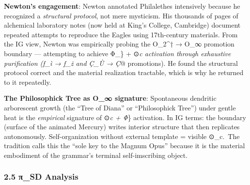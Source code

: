\documentclass[
  11pt,
  a4paper,
]{article}
\begin{document}
\textbf{Newton's engagement}: Newton annotated Philalethes intensively
because he recognized a \emph{structural protocol}, not mere mysticism.
His thousands of pages of alchemical laboratory notes (now held at
King's College, Cambridge) document repeated attempts to reproduce the
Eagles using 17th-century materials. From the IG view, Newton was
empirically probing the O\_2\^{}† → O\_∞ promotion boundary ---
attempting to achieve Φ\_\} + ⊙\emph{c activation through exhaustive
purification (ƒ\_ì → ƒ\_ż and Ç\_Ù → Ç}@ promotions). He found the
structural protocol correct and the material realization tractable,
which is why he returned to it repeatedly.

\textbf{The Philosophick Tree as O\_∞ signature}: Spontaneous dendritic
arborescent growth (the ``Tree of Diana'' or ``Philosophick Tree'')
under gentle heat is the \emph{empirical} signature of ⊙\emph{c + Φ}\}
activation. In IG terms: the boundary (surface of the animated Mercury)
writes interior structure that then replicates autonomously.
Self-organization without external template = visible ⊙\_c.~The
tradition calls this the ``sole key to the Magnum Opus'' because it is
the material embodiment of the grammar's terminal self-imscribing
object.

\subsubsection{2.5 π\_SD Analysis}\label{ux3c0_sd-analysis}
\end{document}
